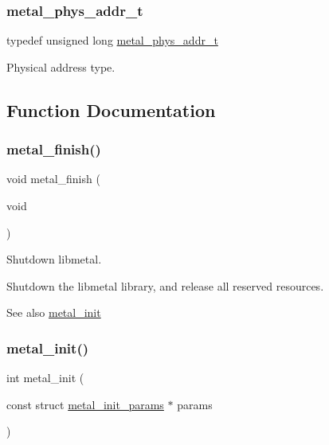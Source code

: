 \subsubsection{\texorpdfstring{metal\+\_\+phys\+\_\+addr\+\_\+t}{metal\_phys\_addr\_t}}
{\footnotesize\ttfamily typedef unsigned long \hyperlink{group__system_gae024fa10b72199a3e26c29b6eb97df5d}{metal\+\_\+phys\+\_\+addr\+\_\+t}}

Physical address type. 

\subsection{Function Documentation}
\mbox{\label{group__system_ga5760e3af70ec9a782c53e8ad9193d66b}} 
\subsubsection{\texorpdfstring{metal\+\_\+finish()}{metal\_finish()}}
{\footnotesize\ttfamily void metal\+\_\+finish (\begin{DoxyParamCaption}\item[{void}]{ }\end{DoxyParamCaption})}



Shutdown libmetal. 

Shutdown the libmetal library, and release all reserved resources.

\begin{DoxySeeAlso}{See also}
\hyperlink{group__system_ga9a5f477e8ab7ed4bcc57e6d01a4ad3c7}{metal\+\_\+init} 
\end{DoxySeeAlso}
\mbox{\label{group__system_ga9a5f477e8ab7ed4bcc57e6d01a4ad3c7}} 
\subsubsection{\texorpdfstring{metal\+\_\+init()}{metal\_init()}}
{\footnotesize\ttfamily int metal\+\_\+init (\begin{DoxyParamCaption}\item[{const struct \hyperlink{structmetal__init__params}{metal\+\_\+init\+\_\+params} $\ast$}]{params }\end{DoxyParamCaption})}



